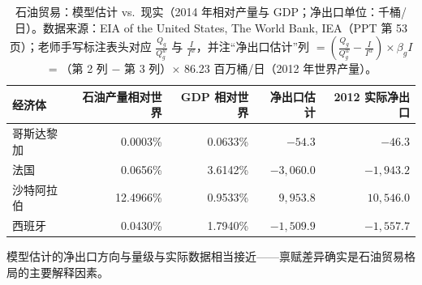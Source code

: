 \begin{table}[H]
  \centering
  \caption{石油贸易：模型估计 vs.\ 现实（2014 年相对产量与 GDP；净出口单位：千桶/日）。数据来源：EIA of the United States, The World Bank, IEA（PPT 第 53 页）；老师手写标注表头对应 $\frac{Q_g}{Q_g^w}$ 与 $\frac{I}{I^w}$，并注``净出口估计''列 $= \left( \frac{Q_g}{Q_g^w} - \frac{I}{I^w} \right) \times \beta_g I$ $=$（第 2 列 $-$ 第 3 列）$\times$ 86.23 百万桶/日（2012 年世界产量）。}
  \label{tab:ch02-oil}
  \begin{tabular}{@{}lrrrr@{}}
    \toprule
    经济体 & 石油产量相对世界 & GDP 相对世界 & 净出口估计 & 2012 实际净出口 \\
    \midrule
    哥斯达黎加 & 0.0003\% & 0.0633\% & $-54.3$ & $-46.3$ \\
    法国 & 0.0656\% & 3.6142\% & $-3{,}060.0$ & $-1{,}943.2$ \\
    沙特阿拉伯 & 12.4966\% & 0.9533\% & $9{,}953.8$ & $10{,}546.0$ \\
    西班牙 & 0.0430\% & 1.7940\% & $-1{,}509.9$ & $-1{,}557.7$ \\
    \bottomrule
  \end{tabular}
\end{table}

模型估计的净出口方向与量级与实际数据相当接近——禀赋差异确实是石油贸易格局的主要解释因素。


